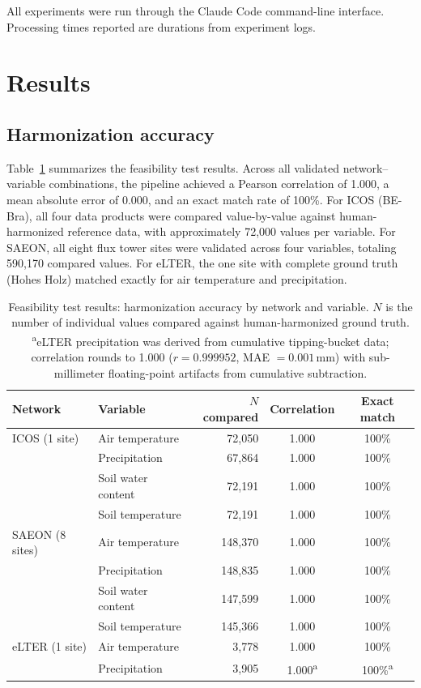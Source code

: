 \documentclass[review,authoryear]{elsarticle}
\begin{document}
All experiments were run through the Claude Code command-line interface. Processing times reported are durations from experiment logs.


\section{Results}
\label{sec:results}

\subsection{Harmonization accuracy}
\label{sec:accuracy}

Table~\ref{tab:feasibility} summarizes the feasibility test results. Across all validated network--variable combinations, the pipeline achieved a Pearson correlation of 1.000, a mean absolute error of 0.000, and an exact match rate of 100\%. For ICOS (BE-Bra), all four data products were compared value-by-value against human-harmonized reference data, with approximately 72{,}000 values per variable. For SAEON, all eight flux tower sites were validated across four variables, totaling 590{,}170 compared values. For eLTER, the one site with complete ground truth (Hohes Holz) matched exactly for air temperature and precipitation.

\begin{table}[htbp]
\centering
\caption{Feasibility test results: harmonization accuracy by network and variable. $N$ is the number of individual values compared against human-harmonized ground truth. \textsuperscript{a}eLTER precipitation was derived from cumulative tipping-bucket data; correlation rounds to 1.000 ($r = 0.999952$, MAE $= 0.001$\,mm) with sub-millimeter floating-point artifacts from cumulative subtraction.}
\label{tab:feasibility}
\small
\begin{tabular}{llrcc}
\toprule
Network & Variable & $N$ compared & Correlation & Exact match \\
\midrule
ICOS (1 site) & Air temperature & 72{,}050 & 1.000 & 100\% \\
 & Precipitation & 67{,}864 & 1.000 & 100\% \\
 & Soil water content & 72{,}191 & 1.000 & 100\% \\
 & Soil temperature & 72{,}191 & 1.000 & 100\% \\
\midrule
SAEON (8 sites) & Air temperature & 148{,}370 & 1.000 & 100\% \\
 & Precipitation & 148{,}835 & 1.000 & 100\% \\
 & Soil water content & 147{,}599 & 1.000 & 100\% \\
 & Soil temperature & 145{,}366 & 1.000 & 100\% \\
\midrule
eLTER (1 site) & Air temperature & 3{,}778 & 1.000 & 100\% \\
 & Precipitation & 3{,}905 & 1.000\textsuperscript{a} & 100\%\textsuperscript{a} \\
\bottomrule
\end{tabular}
\end{table}
\end{document}
